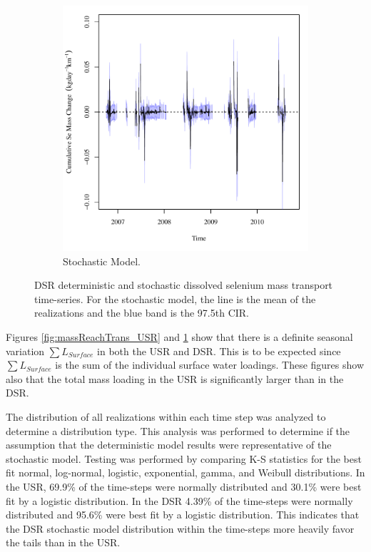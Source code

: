 \begin{landscape}
\begin{figure}
\begin{subfigure}{0.7\textwidth}
			\includegraphics[width=\tableCustomSize]{"Figures/Results_DSR/Stochastic/Balance Mass - Storage"}
			\caption{Stochastic Model.}
		\end{subfigure}
		\caption[DSR deterministic and stochastic dissolved selenium mass transport time-series.]{DSR deterministic and stochastic dissolved selenium mass transport time-series.  For the stochastic model, the line is the mean of the realizations and the blue band is the 97.5th CIR.}
		\label{fig:massReachTrans_DSR}
	\end{figure}
\end{landscape}

Figures \ref{fig:massReachTrans_USR} and \ref{fig:massReachTrans_DSR} show that there is a definite seasonal variation $ \sum L_{Surface} $ in both the USR and DSR.  This is to be expected since $ \sum L_{Surface} $ is the sum of the individual surface water loadings.  These figures show also that the total mass loading in the USR is significantly larger than in the DSR.

The distribution of all realizations within each time step was analyzed to determine a distribution type.  This analysis was performed to determine if the assumption that the deterministic model results were representative of the stochastic model.  Testing was performed by comparing K-S statistics for the best fit normal, log-normal, logistic, exponential, gamma, and Weibull distributions.  In the USR, 69.9\% of the time-steps were normally distributed and 30.1\% were best fit by a logistic distribution.  In the DSR 4.39\% of the time-steps were normally distributed and 95.6\% were best fit by a logistic distribution.  This indicates that the DSR stochastic model distribution within the time-steps more heavily favor the tails than in the USR. 

